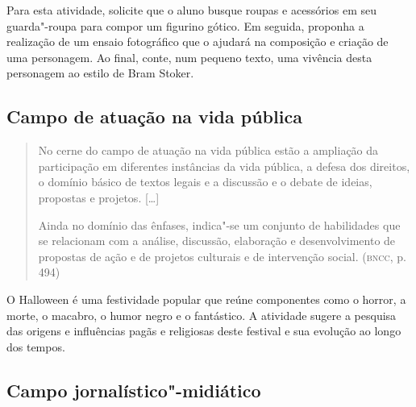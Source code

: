 \documentclass[12pt]{extarticle}
\begin{document}
Para esta atividade, solicite que o aluno busque roupas e acessórios
  em seu guarda"-roupa para compor um figurino gótico. Em seguida,
  proponha a realização de um ensaio fotográfico que o ajudará na
  composição e criação de uma personagem. Ao final, conte, num pequeno
  texto, uma vivência desta personagem ao estilo de Bram Stoker.

\subsection{Campo de atuação na vida pública}

\begin{quote}
No cerne do campo de atuação na vida pública estão a ampliação da
participação em diferentes instâncias da vida pública, a defesa dos
direitos, o domínio básico de textos legais e a discussão e o debate de
ideias, propostas e projetos. {[}\ldots{}{]}

Ainda no domínio das ênfases, indica"-se um conjunto de habilidades que
se relacionam com a análise, discussão, elaboração e desenvolvimento de
propostas de ação e de projetos culturais e de intervenção social.
(\textsc{bncc}, p. 494)
\end{quote}

O Halloween é uma festividade popular que reúne componentes como o
horror, a morte, o macabro, o humor negro e o fantástico. A atividade
sugere a pesquisa das origens e influências pagãs e religiosas deste
festival e sua evolução ao longo dos tempos.

\subsection{Campo jornalístico"-midiático}
\end{document}
